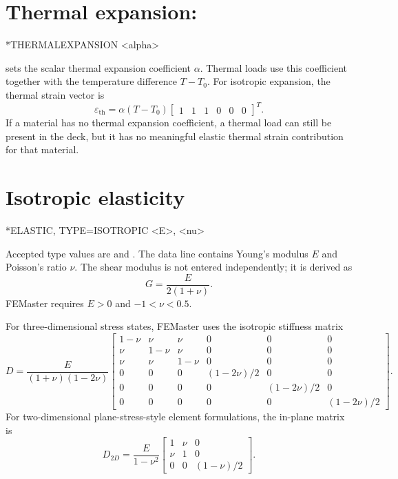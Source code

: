 \section{Thermal expansion: }

\begin{syntax}
*THERMALEXPANSION
<alpha>
\end{syntax}

 sets the scalar thermal expansion coefficient \(\alpha\). Thermal loads use this coefficient together with the temperature difference \(T-T_0\). For isotropic expansion, the thermal strain vector is
\[
\varepsilon_\mathrm{th}
=
\alpha (T-T_0)
\begin{bmatrix}
1 & 1 & 1 & 0 & 0 & 0
\end{bmatrix}^T .
\]
If a material has no thermal expansion coefficient, a thermal load can still be present in the deck, but it has no meaningful elastic thermal strain contribution for that material.

\section{Isotropic elasticity}

\begin{syntax}
*ELASTIC, TYPE=ISOTROPIC
<E>, <nu>
\end{syntax}

Accepted type values are  and . The data line contains Young's modulus \(E\) and Poisson's ratio \(\nu\). The shear modulus is not entered independently; it is derived as
\[
G = \frac{E}{2(1+\nu)} .
\]
FEMaster requires \(E>0\) and \(-1<\nu<0.5\).

For three-dimensional stress states, FEMaster uses the isotropic stiffness matrix
\[
D =
\frac{E}{(1+\nu)(1-2\nu)}
\begin{bmatrix}
1-\nu & \nu & \nu & 0 & 0 & 0\\
\nu & 1-\nu & \nu & 0 & 0 & 0\\
\nu & \nu & 1-\nu & 0 & 0 & 0\\
0 & 0 & 0 & (1-2\nu)/2 & 0 & 0\\
0 & 0 & 0 & 0 & (1-2\nu)/2 & 0\\
0 & 0 & 0 & 0 & 0 & (1-2\nu)/2
\end{bmatrix}.
\]
For two-dimensional plane-stress-style element formulations, the in-plane matrix is
\[
D_{2D} =
\frac{E}{1-\nu^2}
\begin{bmatrix}
1 & \nu & 0\\
\nu & 1 & 0\\
0 & 0 & (1-\nu)/2
\end{bmatrix}.
\]

